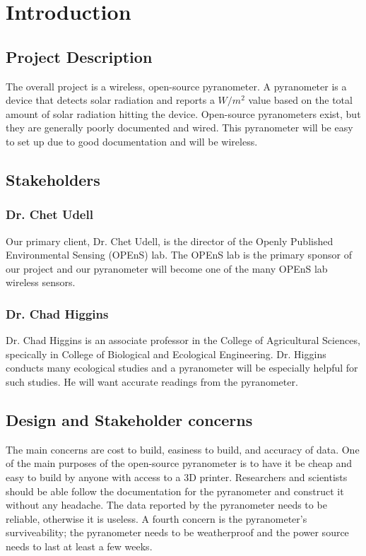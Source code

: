 \documentclass[10pt,draftclsnofoot,onecolumn,letterpaper]{article}
\begin{document}
\newpage
{}
\tableofcontents
\clearpage

\section{Introduction}
\subsection{Project Description}
The overall project is a wireless, open-source pyranometer. A pyranometer is a device that detects solar radiation and reports a $W/m^2$ value based on the total amount of solar radiation hitting the device. Open-source pyranometers exist, but they are generally poorly documented and wired. This pyranometer will be easy to set up due to good documentation and will be wireless.
\subsection{Stakeholders}
\subsubsection{Dr. Chet Udell}
Our primary client, Dr. Chet Udell, is the director of the Openly Published Environmental Sensing (OPEnS) lab. The OPEnS lab is the primary sponsor of our project and our pyranometer will become one of the many OPEnS lab wireless sensors.

\subsubsection{Dr. Chad Higgins}
Dr. Chad Higgins is an associate professor in the College of Agricultural Sciences, specically in College of Biological and Ecological Engineering. Dr. Higgins conducts many ecological studies and a pyranometer will be especially helpful for such studies. He will want accurate readings from the pyranometer. 

\subsection{Design and Stakeholder concerns}
The main concerns are cost to build, easiness to build, and accuracy of data. One of the main purposes of the open-source pyranometer is to have it be cheap and easy to build by anyone with access to a 3D printer. Researchers and scientists should be able follow the documentation for the pyranometer and construct it without any headache. The data reported by the pyranometer needs to be reliable, otherwise it is useless. A fourth concern is the pyranometer's surviveability; the pyranometer needs to be weatherproof and the power source needs to last at least a few weeks.
\end{document}
